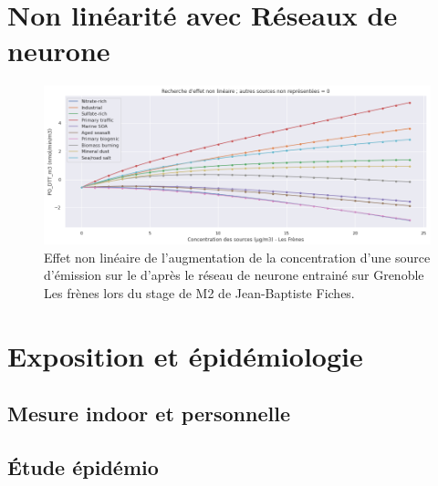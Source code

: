 \section{Non linéarité avec Réseaux de neurone}

\begin{figure}[ht]
    \centering
    \includegraphics[width=0.8\linewidth]{figures/chapter05/10sourcesLinearite.PNG}
    \caption{Effet non linéaire de l'augmentation de la concentration d'une source
        d'émission sur le \PODTTv{} d'après le réseau de neurone entrainé sur Grenoble Les
    frènes lors du stage de M2 de Jean-Baptiste Fiches.}%
    \label{fig:figures/chapter05/10sourcesLinearite}
\end{figure}

\section{Exposition et épidémiologie}
\subsection{Mesure indoor et personnelle}
\subsection{Étude épidémio}

